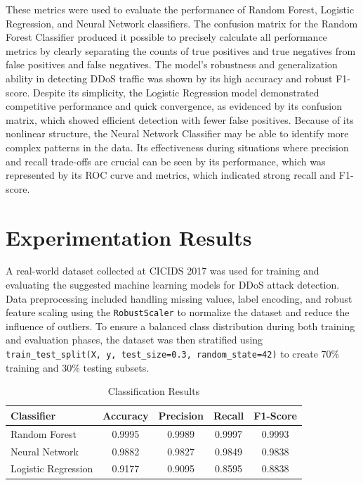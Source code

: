 \documentclass[conference]{IEEEtran}
\begin{document}
These metrics were used to evaluate the performance of Random Forest, Logistic Regression, and Neural Network classifiers. The confusion matrix for the Random Forest Classifier produced it possible to precisely calculate all performance metrics by clearly separating the counts of true positives and true negatives from false positives and false negatives. The model's robustness and generalization ability in detecting DDoS traffic was shown by its high accuracy and robust F1-score. Despite its simplicity, the Logistic Regression model demonstrated competitive performance and quick convergence, as evidenced by its confusion matrix, which showed efficient detection with fewer false positives. Because of its nonlinear structure, the Neural Network Classifier may be able to identify more complex patterns in the data. Its effectiveness during situations where precision and recall trade-offs are crucial can be seen by its performance, which was represented by its ROC curve and metrics, which indicated strong recall and F1-score.




\section{Experimentation Results}

A real-world dataset collected at CICIDS 2017 was used for training and evaluating the suggested machine learning models for DDoS attack detection. Data preprocessing included handling missing values, label encoding, and robust feature scaling using the \texttt{RobustScaler} to normalize the dataset and reduce the influence of outliers. To ensure a balanced class distribution during both training and evaluation phases, the dataset was then stratified using \texttt{train\_test\_split(X, y, test\_size=0.3, random\_state=42)} to create 70\% training and 30\% testing subsets.

\begin{table}[htbp]
\caption{Classification Results}
\label{tab:classification_results}
\centering
\begin{tabular}{|l|c|c|c|c|}
\hline
\textbf{Classifier} & \textbf{Accuracy} & \textbf{Precision} & \textbf{Recall} & \textbf{F1-Score} \\
\hline
Random Forest & 0.9995 & 0.9989 & 0.9997 & 0.9993 \\
Neural Network & 0.9882 & 0.9827 & 0.9849 & 0.9838 \\
Logistic Regression & 0.9177 & 0.9095 & 0.8595 & 0.8838 \\
\hline
\end{tabular}
\end{table}
\end{document}

